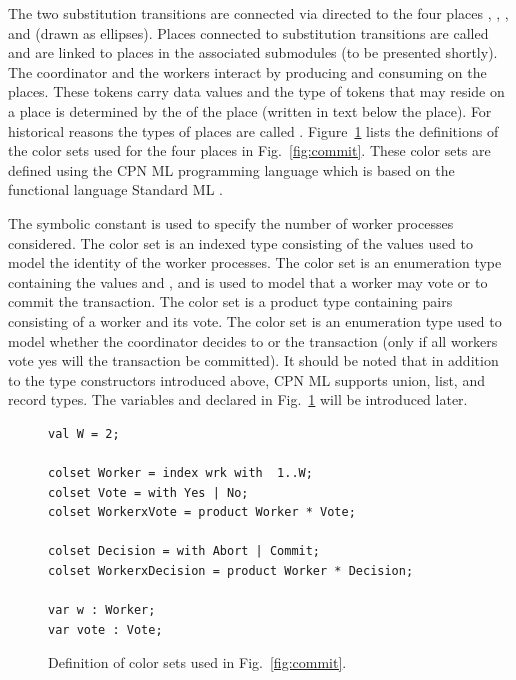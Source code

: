 
The two substitution transitions are connected via directed
 to the four places ,
, , and  (drawn
as ellipses). Places connected to substitution transitions are called
 and are linked to  places in the
associated submodules (to be presented shortly). The coordinator and
the workers interact by producing and consuming  on
the places. These tokens carry data values and the type of tokens that
may reside on a place is determined by the  of the place
(written in text below the place). For historical reasons the types of
places are called . Figure~\ref{fig:coloursets}
lists the definitions of the color sets used for the four places in
Fig.~\ref{fig:commit}. These color sets are defined using the CPN ML
programming language which is based on the functional language
Standard ML \cite{sml}.

The symbolic constant  is used to specify the number of
worker processes considered. The  color set is an
indexed type consisting of the values
 used to model the identity of the
worker processes. The color set  is an enumeration type
containing the values  and , and is used to
model that a worker may vote  or  to commit
the transaction. The color set  is a product type
containing pairs consisting of a worker and its vote. The color set
 is an enumeration type used to model whether the
coordinator decides to  or  the
transaction (only if all workers vote yes will the transaction be
committed). It should be noted that in addition to the type
constructors introduced above, CPN ML supports union, list, and
record types. The variables  and  declared in
Fig.~\ref{fig:coloursets} will be introduced later.

\begin{figure}[]
\begin{verbatim}
val W = 2;

colset Worker = index wrk with  1..W;
colset Vote = with Yes | No;
colset WorkerxVote = product Worker * Vote;

colset Decision = with Abort | Commit;
colset WorkerxDecision = product Worker * Decision;

var w : Worker;
var vote : Vote;
\end{verbatim}
\vspace*{-1em}
\caption{Definition of color sets used in Fig.~\ref{fig:commit}.}
\label{fig:coloursets}
\end{figure}


